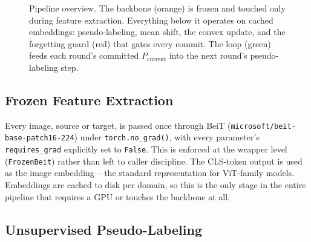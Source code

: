 \documentclass[11pt]{article}
\begin{document}
\begin{figure}[H]
\caption{Pipeline overview. The backbone (orange) is frozen and touched only during feature
extraction. Everything below it operates on cached embeddings: pseudo-labeling, mean shift, the
convex update, and the forgetting guard (red) that gates every commit. The loop (green) feeds
each round's committed $P_{\mathrm{current}}$ into the next round's pseudo-labeling step.}
\label{fig:architecture}
\end{figure}

\subsection{Frozen Feature Extraction}

Every image, source or target, is passed once through BeiT
(\texttt{microsoft/beit-base-patch16-224}) under \texttt{torch.no\_grad()}, with every parameter's
\texttt{requires\_grad} explicitly set to \texttt{False}. This is enforced at the wrapper level
(\texttt{FrozenBeit}) rather than left to caller discipline. The CLS-token output is used as the
image embedding -- the standard representation for ViT-family models. Embeddings are cached to
disk per domain, so this is the only stage in the entire pipeline that requires a GPU or touches
the backbone at all.

\subsection{Unsupervised Pseudo-Labeling}
\end{document}
